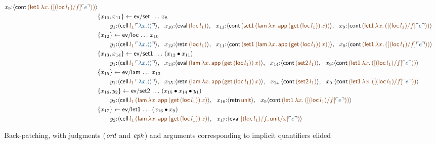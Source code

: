\begin{sidewaysfigure}[p]
\begin{align*}
x_9{:}\susp{{\sf cont}\,
  \lf{({\sf let1}\,\lambda x.\,([({\sf loc}\,l_1)/f]\interp{e}))}}
\\
& \trstep{x_{10},x_{11}}{{\sf ev/set}\,\ldots\,x_8}
\\
&\qquad
y_1{:}\susp{{\sf cell}\,\lf{l_1}\,\interp{\lambda x. \langle\rangle}}, ~~
x_{10}{:}\susp{{\sf eval}\,
  \lf{({\sf loc}\,l_1)}}, ~~
x_{11}{:}\susp{{\sf cont}\,
  \lf{({\sf set1}\,({\sf lam}\,\lambda x.\,{\sf app}\,({\sf get}\,({\sf loc}\,l_1))\,x))}}, ~~
x_9{:}\susp{{\sf cont}\,
  \lf{({\sf let1}\,\lambda x.\,([({\sf loc}\,l_1)/f]\interp{e}))}}
\\
& \trstep{x_{12}}{{\sf ev/loc}\,\ldots\,x_{10}}
\\
&\qquad
y_1{:}\susp{{\sf cell}\,\lf{l_1}\,\interp{\lambda x. \langle\rangle}}, ~~
x_{12}{:}\susp{{\sf retn}\,
  \lf{({\sf loc}\,l_1)}}, ~~
x_{11}{:}\susp{{\sf cont}\,
  \lf{({\sf set1}\,({\sf lam}\,\lambda x.\,{\sf app}\,({\sf get}\,({\sf loc}\,l_1))\,x))}}, ~~
x_9{:}\susp{{\sf cont}\,
  \lf{({\sf let1}\,\lambda x.\,([({\sf loc}\,l_1)/f]\interp{e}))}}
\\
& \trstep{x_{13},x_{14}}{{\sf ev/set1}\,\ldots\,(\tfuser{x_{12}}{x_{11}})}
\\
&\qquad
y_1{:}\susp{{\sf cell}\,\lf{l_1}\,\interp{\lambda x. \langle\rangle}}, ~~
x_{13}{:}\susp{{\sf eval}\,
  \lf{({\sf lam}\,\lambda x.\,{\sf app}\,({\sf get}\,({\sf loc}\,l_1))\,x)}}, ~~
x_{14}{:}\susp{{\sf cont}\,
  \lf{({\sf set2}\,l_1)}}, ~~
x_9{:}\susp{{\sf cont}\,
  \lf{({\sf let1}\,\lambda x.\,([({\sf loc}\,l_1)/f]\interp{e}))}}
\\
& \trstep{x_{15}}{{\sf ev/lam}\,\ldots\,x_{13}}
\\
&\qquad
y_1{:}\susp{{\sf cell}\,\lf{l_1}\,\interp{\lambda x. \langle\rangle}}, ~~
x_{15}{:}\susp{{\sf retn}\,
  \lf{({\sf lam}\,\lambda x.\,{\sf app}\,({\sf get}\,({\sf loc}\,l_1))\,x)}}, ~~
x_{14}{:}\susp{{\sf cont}\,
  \lf{({\sf set2}\,l_1)}}, ~~
x_9{:}\susp{{\sf cont}\,
  \lf{({\sf let1}\,\lambda x.\,([({\sf loc}\,l_1)/f]\interp{e}))}}
\\
& \trstep{x_{16},y_2}{{\sf ev/set2}\,\ldots\,(\tfuser{x_{15}}{\tfuser{x_{14}}{y_1}})}
\\
&\qquad
y_2{:}\susp{{\sf cell}\,\lf{l_1}\,
  \lf{({\sf lam}\,\lambda x.\,{\sf app}\,({\sf get}\,({\sf loc}\,l_1))\,x)}}, ~~
x_{16}{:}\susp{{\sf retn}\,
  \lf{\sf unit}}, ~~
x_9\susp{{\sf cont}\,
  \lf{({\sf let1}\,\lambda x.\,([({\sf loc}\,l_1)/f]\interp{e}))}}
\\
& \trstep{x_{17}}{{\sf ev/let1}\,\ldots\,(\tfuser{x_{16}}{x_9})}
\\
&\qquad
y_2{:}\susp{{\sf cell}\,\lf{l_1}\,
  \lf{({\sf lam}\,\lambda x.\,{\sf app}\,({\sf get}\,({\sf loc}\,l_1))\,x)}}, ~~
x_{17}{:}\susp{{\sf eval}\,
  \lf{[({\sf loc}\,l_1)/f, {\sf unit}/x]\interp{e})}}
\end{align*}
\caption{Back-patching, with judgments (${\it ord}$ and ${\it eph}$) and
  arguments corresponding to implicit quantifiers elided}
\end{sidewaysfigure}

